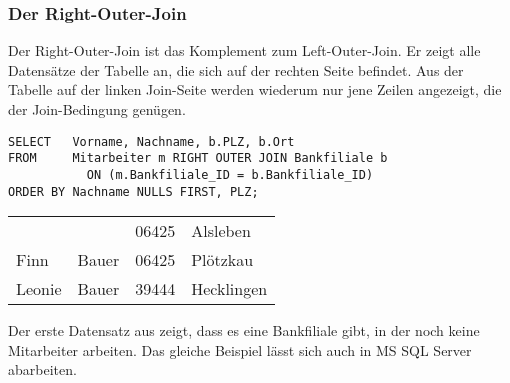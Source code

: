         \subsubsection{Der Right-Outer-Join}
          Der Right-Outer-Join ist das Komplement zum Left-Outer-Join. Er zeigt alle Datens\"atze der Tabelle an, die sich auf der rechten Seite befindet. Aus der Tabelle auf der linken Join-Seite werden wiederum nur jene Zeilen angezeigt, die der Join-Bedingung gen\"ugen.
          \begin{lstlisting}[language=oracle_sql,caption={Ein Right-Outer-Join in Oracle},label=sql04_15]
SELECT   Vorname, Nachname, b.PLZ, b.Ort
FROM     Mitarbeiter m RIGHT OUTER JOIN Bankfiliale b
           ON (m.Bankfiliale_ID = b.Bankfiliale_ID)
ORDER BY Nachname NULLS FIRST, PLZ;
          \end{lstlisting}
          \begin{center}
            \begin{small}
              \tablehead{}
              \tabletail {
              }
              \begin{oraclesql}
                \begin{supertabular}{llll}
                &  & 06425 & Alsleben \\
                Finn & Bauer & 06425 & Pl\"otzkau \\
                Leonie & Bauer & 39444 & Hecklingen \\
                \end{supertabular}
              \end{oraclesql}
            \end{small}
          \end{center}
          Der erste Datensatz aus  zeigt, dass es eine Bankfiliale gibt, in der noch keine Mitarbeiter arbeiten. Das gleiche Beispiel l\"asst sich auch  in MS SQL Server abarbeiten.
